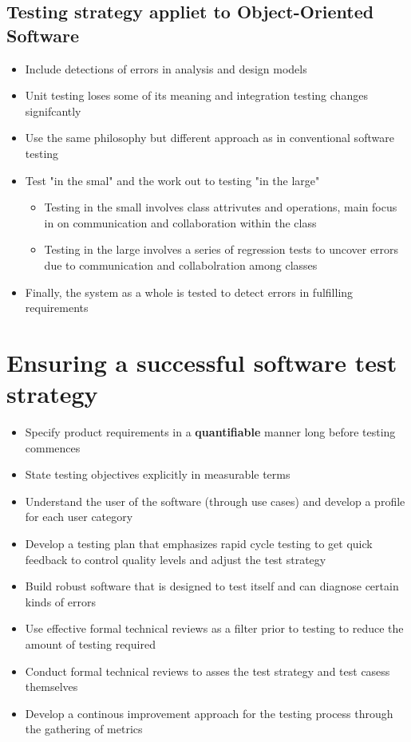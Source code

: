 \documentclass{article}
\begin{document}
\subsection{Testing strategy appliet to Object-Oriented Software}

\begin{itemize}
  \item Include detections of errors in analysis and design models
  \item Unit testing loses some of its meaning and integration testing changes signifcantly
  \item Use the same philosophy but different approach as in conventional software testing
  \item Test "in the smal" and the work out to testing "in the large"
  \begin{itemize}
    \item Testing in the small involves class attrivutes and operations, main focus in on communication and collaboration within the class
    \item Testing in the large involves a series of regression tests to uncover errors due to communication and collabolration among classes
  \end{itemize}
  \item Finally, the system as a whole is tested to detect errors in fulfilling requirements
\end{itemize}

\section{Ensuring a successful software test strategy}

\begin{itemize}
  \item Specify product requirements in a \textbf{quantifiable} manner long before testing commences
  \item State testing objectives explicitly in measurable terms
  \item Understand the user of the software (through use cases) and develop a profile for each user category
  \item Develop a testing plan that emphasizes rapid cycle testing to get quick feedback to control quality levels and adjust the test strategy
  \item Build robust software that is designed to test itself and can diagnose certain kinds of errors
  \item Use effective formal technical reviews as a filter prior to testing to reduce the amount of testing required
  \item Conduct formal technical reviews to asses the test strategy and test casess themselves
  \item Develop a continous improvement approach for the testing process through the gathering of metrics
\end{itemize}
\end{document}
